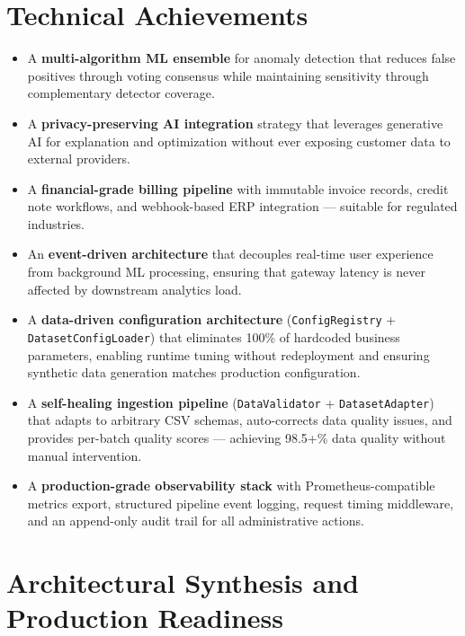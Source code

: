 \documentclass[12pt,a4paper,twoside]{report}
\begin{document}
\section{Technical Achievements}

\begin{itemize}
  \item A \textbf{multi-algorithm ML ensemble} for anomaly detection that reduces false positives through voting consensus while maintaining sensitivity through complementary detector coverage.

  \item A \textbf{privacy-preserving AI integration} strategy that leverages generative AI for explanation and optimization without ever exposing customer data to external providers.

  \item A \textbf{financial-grade billing pipeline} with immutable invoice records, credit note workflows, and webhook-based ERP integration — suitable for regulated industries.

  \item An \textbf{event-driven architecture} that decouples real-time user experience from background ML processing, ensuring that gateway latency is never affected by downstream analytics load.

  \item A \textbf{data-driven configuration architecture} (\texttt{ConfigRegistry} + \texttt{DatasetConfigLoader}) that eliminates 100\% of hardcoded business parameters, enabling runtime tuning without redeployment and ensuring synthetic data generation matches production configuration.

  \item A \textbf{self-healing ingestion pipeline} (\texttt{DataValidator} + \texttt{DatasetAdapter}) that adapts to arbitrary CSV schemas, auto-corrects data quality issues, and provides per-batch quality scores — achieving 98.5+\% data quality without manual intervention.

  \item A \textbf{production-grade observability stack} with Prometheus-compatible metrics export, structured pipeline event logging, request timing middleware, and an append-only audit trail for all administrative actions.
\end{itemize}

\section{Architectural Synthesis and Production Readiness}
\end{document}
